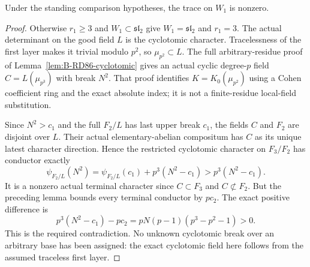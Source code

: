 \begin{proposition}
\label{prop:B-RD97-trace}
Under the standing comparison hypotheses, the trace on $W_1$
is nonzero.
\end{proposition}
\begin{proof}
Otherwise $r_1\ge3$ and $W_1\subset\mathfrak{sl}_2$ give
$W_1=\mathfrak{sl}_2$ and $r_1=3$. The actual determinant on
the good field $L$ is the cyclotomic character. Tracelessness
of the first layer makes it trivial modulo $p^2$, so
$\mu_{p^2}\subset L$. The full arbitrary-residue proof of
Lemma~\ref{lem:B-RD86-cyclotomic} gives an actual cyclic degree-$p$
field $C=L(\mu_{p^3})$ with break $N^2$. That proof identifies
$K=K_0(\mu_{p^2})$ using a Cohen coefficient ring and the exact
absolute index; it is not a finite-residue local-field substitution.

Since $N^2>c_1$ and the full $F_2/L$ has last upper break $c_1$,
the fields $C$ and $F_2$ are disjoint over $L$. Their actual
elementary-abelian compositum has $C$ as its unique latest
character direction. Hence the restricted cyclotomic character
on $F_3/F_2$ has conductor exactly
\[
 \psi_{F_2/L}(N^2)
   =\psi_{F_2/L}(c_1)+p^3(N^2-c_1)
   >p^3(N^2-c_1).                                   \tag{B-RD97.15}
\]
It is a nonzero actual terminal character since $C\subset F_3$
and $C\not\subset F_2$. But the preceding lemma bounds every
terminal conductor by $p c_2$. The exact positive difference is
\[
 p^3(N^2-c_1)-p c_2
          =pN(p-1)(p^3-p^2-1)>0.                    \tag{B-RD97.16}
\]
This is the required contradiction. No unknown cyclotomic break
over an arbitrary base has been assigned: the exact cyclotomic
field here follows from the assumed traceless first layer.
\end{proof}

